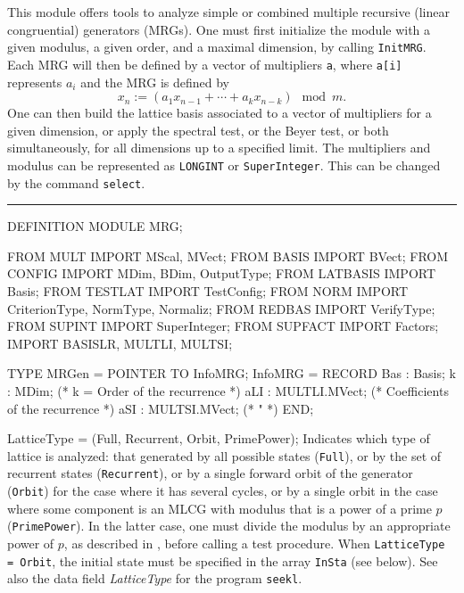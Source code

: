 
This module offers tools to analyze simple or combined 
multiple recursive (linear congruential) generators (MRGs).
One must first initialize the module with a given modulus,
a given order, and a maximal dimension, by calling {\tt InitMRG}.
Each MRG will then be defined by a vector of multipliers {\tt a},
where {\tt a[i]} represents $a_i$ and the MRG is defined by
 $$ x_n := (a_1 x_{n-1} + \cdots + a_k x_{n-k}) \mod m.$$
One can then build the lattice basis associated to a vector of multipliers
for a given dimension, or apply the spectral test, or the Beyer test,
or both simultaneously, for all dimensions up to a specified limit.
The multipliers and modulus can be represented as {\tt LONGINT} or
{\tt SuperInteger}.  This can be changed by the command {\tt select}.

\bigskip\hrule
\code

DEFINITION MODULE MRG;

FROM MULT     IMPORT MScal, MVect;
FROM BASIS    IMPORT BVect;
FROM CONFIG   IMPORT MDim, BDim, OutputType;
FROM LATBASIS IMPORT Basis;
FROM TESTLAT  IMPORT TestConfig;
FROM NORM     IMPORT CriterionType, NormType, Normaliz;
FROM REDBAS   IMPORT VerifyType;
FROM SUPINT   IMPORT SuperInteger;
FROM SUPFACT  IMPORT Factors;
IMPORT BASISLR, MULTLI, MULTSI;

TYPE
   MRGen =  POINTER TO InfoMRG;
   InfoMRG = RECORD
      Bas   : Basis;
      k     : MDim;                     (* k = Order  of the recurrence *)
      aLI   : MULTLI.MVect;             (* Coefficients of the recurrence *)
      aSI   : MULTSI.MVect;             (*               "                *)
      END;



   LatticeType = (Full, Recurrent, Orbit, PrimePower);
\endcode
 \tabb Indicates which type of lattice is analyzed: that generated 
  by all possible states ({\tt Full}), 
  or by the set of recurrent states ({\tt Recurrent}), 
  or by a single forward orbit of the generator
  ({\tt Orbit}) for the case where it has several cycles, 
  or by a single orbit in the case where
  some component is an MLCG with modulus that is a power of a prime $p$
  ({\tt PrimePower}).  In the latter case, one must divide the modulus
  by an appropriate power of $p$, as described in \cite{rLEC97c},
  before calling a test procedure. 
  When {\tt LatticeType = Orbit}, the initial state must be specified
  in the array {\tt InSta} (see below).
  See also the data field {\em LatticeType\/} for the program {\tt seekl}.
 \endtabb
\code


